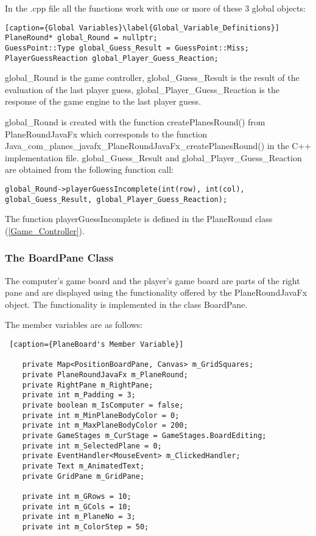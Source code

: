 In the .cpp file all the functions work with one or more of these 3 global objects:

\begin{lstlisting}[caption={Global Variables}\label{Global_Variable_Definitions}] 
PlaneRound* global_Round = nullptr;
GuessPoint::Type global_Guess_Result = GuessPoint::Miss;
PlayerGuessReaction global_Player_Guess_Reaction;
\end{lstlisting}

global\_Round is the game controller, global\_Guess\_Result is the result of the evaluation of the last player guess, global\_Player\_Guess\_Reaction is the response of the game engine to the last player guess. 

global\_Round is created with the function createPlanesRound() from PlaneRoundJavaFx which corresponds to the function\\ Java\_com\_planes\_javafx\_PlaneRoundJavaFx\_createPlanesRound() in the C++ implementation file. global\_Guess\_Result and global\_Player\_Guess\_Reaction are obtained from the following function call:

\begin{lstlisting}
global_Round->playerGuessIncomplete(int(row), int(col), global_Guess_Result, global_Player_Guess_Reaction);
\end{lstlisting}

The function playerGuessIncomplete is defined in the PlaneRound class (\ref{Game_Controller}).

\subsubsection {The BoardPane Class}

The computer's game board and the player's game board are parts of the right pane and are displayed using the functionality offered by the PlaneRoundJavaFx object. The functionality is implemented in the class BoardPane.

The member variables are as follows:

\begin{lstlisting} [caption={PlaneBoard's Member Variable}]

	private Map<PositionBoardPane, Canvas> m_GridSquares;
	private PlaneRoundJavaFx m_PlaneRound;
	private RightPane m_RightPane;
	private int m_Padding = 3;
	private boolean m_IsComputer = false;
	private int m_MinPlaneBodyColor = 0;
	private int m_MaxPlaneBodyColor = 200;	
	private GameStages m_CurStage = GameStages.BoardEditing;
	private int m_SelectedPlane = 0;
	private EventHandler<MouseEvent> m_ClickedHandler;
	private Text m_AnimatedText;
	private GridPane m_GridPane;

	private int m_GRows = 10;
	private int m_GCols = 10;
	private int m_PlaneNo = 3;
	private int m_ColorStep = 50;

\end{lstlisting}

